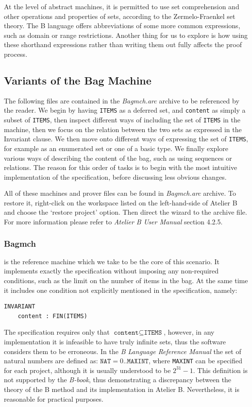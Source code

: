 \documentclass[12pt,journal,duplex]{IEEEtran}
\begin{document}
	At the level of abstract machines, it is permitted to use set comprehension and other operations and properties of sets, according to the Zermelo-Fraenkel set theory. The B language offers abbreviations of some more common expressions, such as domain or range restrictions. Another thing for us to explore is how using these shorthand expressions rather than writing them out fully affects the proof process.

	\subsection{Variants of the Bag Machine}
	The following files are contained in the \emph{Bagmch.arc} archive to be referenced by the reader. We begin by having \texttt{ITEMS} as a deferred set, and \texttt{content} as simply a subset of \texttt{ITEMS}, then inspect different ways of including the set of \texttt{ITEMS} in the machine, then we focus on the relation between the two sets as expressed in the Invariant clause. We then move onto different ways of expressing the set of \texttt{ITEMS}, for example as an enumerated set or one of a basic type. We finally explore various ways of describing the content of the bag, such as using sequences or relations. The reason for this order of tasks is to begin with the most intuitive implementation of the specification, before discussing less obvious changes.

	All of these machines and prover files can be found in \emph{Bagmch.arc} archive. To restore it, right-click on the workspace listed on the left-hand-side of Atelier B and choose the `restore project' option. Then direct the wizard to the archive file. For more information please refer to \emph{Atelier B User Manual} section 4.2.5.

	\subsubsection{Bagmch} is the reference machine which we take to be the core of this scenario. It implements exactly the specification without imposing any non-required conditions, such as the limit on the number of items in the bag. At the same time it includes one condition not explicitly mentioned in the specification, namely:
\begin{lstlisting}
INVARIANT
	content : FIN(ITEMS)
\end{lstlisting}

	The specification requires only that $\texttt{content} \subseteq \texttt{ITEMS}$, however, in any implementation it is infeasible to have truly infinite sets, thus the software considers them to be erroneous. In the \emph{B Language Reference Manual} the set of natural numbers are defined as: ${\texttt{NAT}  = 0 .. \texttt{MAXINT}}$, where \texttt{MAXINT} can be specified for each project, although it is usually understood to be $2^{31}-1$. This definition is not supported by the \emph{B-book}, thus demonstrating a discrepancy between the theory of the B method and its implementation in Atelier B. Nevertheless, it is reasonable for practical purposes.
\end{document}
